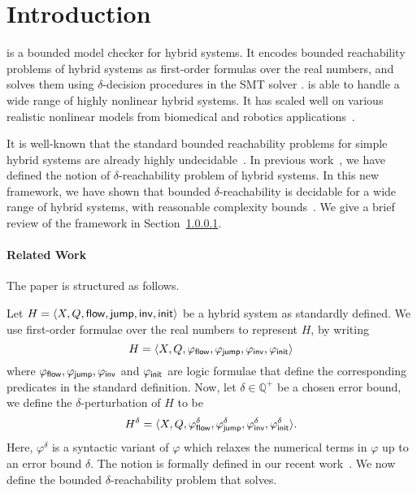 \section{Introduction}

\dReach{} is a bounded model checker for hybrid systems. It encodes bounded reachability problems of hybrid systems as first-order formulas over the real numbers, and solves them using $\delta$-decision procedures in the SMT solver \dReal{}. \dReach{} is able to handle a wide range of highly nonlinear hybrid systems. It has scaled well on various realistic nonlinear models from biomedical and robotics applications~\cite{}. 

It is well-known that the standard bounded reachability problems for simple hybrid systems are already highly undecidable~\cite{DBLP:conf/rex/AlurD91,DBLP:conf/hybrid/AlurCHH92}. In previous work~\cite{}, we have defined the notion of $\delta$-reachability problem of hybrid systems. In this new framework, we have shown that bounded $\delta$-reachability is decidable for a wide range of hybrid systems, with reasonable complexity bounds~\cite{}. We give a brief review of the framework in Section~\ref{}. 

\paragraph{Related Work} 

The paper is structured as follows. 

Let $H = \langle X, Q, \mathsf{flow}, \mathsf{jump}, \mathsf{inv}, \mathsf{init}\rangle$ be a hybrid
system as standardly defined. We use first-order formulae over the
real numbers to represent $H$, by writing $$H = \langle X, Q,
\varphi_{\mathsf{flow}}, \varphi_{\mathsf{jump}}, \varphi_{\mathsf{inv}},
\varphi_{\mathsf{init}}\rangle$$ where $\varphi_{\mathsf{flow}}, \varphi_{\mathsf{jump}},
\varphi_{\mathsf{inv}}$ and $\varphi_{\mathsf{init}}$ are logic formulae that define
the corresponding predicates in the standard definition. Now, let
$\delta\in \mathbb{Q}^+$ be a chosen error bound, we define the
$\delta$-perturbation of $H$ to be $$H^{\delta} = \langle X, Q,
\varphi_{\mathsf{flow}}^{\delta}, \varphi_{\mathsf{jump}}^{\delta},
\varphi_{\mathsf{inv}}^{\delta}, \varphi_{\mathsf{init}}^{\delta}\rangle.$$ Here,
$\varphi^{\delta}$ is a syntactic variant of $\varphi$ which relaxes
the numerical terms in $\varphi$ up to an error bound $\delta$. The
notion is formally defined in our recent
work~\cite{DBLP:conf/lics/GaoAC12,DBLP:conf/cade/GaoAC12,DBLP:journals/corr/GaoKCC14}.
We now define the bounded $\delta$-reachability problem that
\dReach{} solves.

